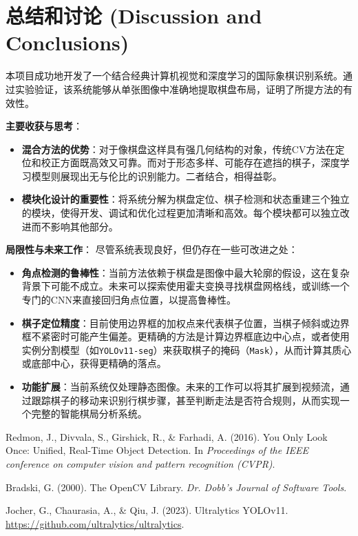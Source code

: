 \documentclass[12pt, a4paper]{article}
\begin{document}
\section{总结和讨论 (Discussion and Conclusions)}
本项目成功地开发了一个结合经典计算机视觉和深度学习的国际象棋识别系统。通过实验验证，该系统能够从单张图像中准确地提取棋盘布局，证明了所提方法的有效性。


\textbf{主要收获与思考}：
\begin{itemize}
    \item \textbf{混合方法的优势}：对于像棋盘这样具有强几何结构的对象，传统CV方法在定位和校正方面既高效又可靠。而对于形态多样、可能存在遮挡的棋子，深度学习模型则展现出无与伦比的识别能力。二者结合，相得益彰。
    \item \textbf{模块化设计的重要性}：将系统分解为棋盘定位、棋子检测和状态重建三个独立的模块，使得开发、调试和优化过程更加清晰和高效。每个模块都可以独立改进而不影响其他部分。
\end{itemize}

\textbf{局限性与未来工作}：
尽管系统表现良好，但仍存在一些可改进之处：
\begin{itemize}
    \item \textbf{角点检测的鲁棒性}：当前方法依赖于棋盘是图像中最大轮廓的假设，这在复杂背景下可能不成立。未来可以探索使用霍夫变换寻找棋盘网格线，或训练一个专门的CNN来直接回归角点位置，以提高鲁棒性。
    \item \textbf{棋子定位精度}：目前使用边界框的加权点来代表棋子位置，当棋子倾斜或边界框不紧密时可能产生偏差。更精确的方法是计算边界框底边中心点，或者使用实例分割模型（如\texttt{YOLOv11-seg}）来获取棋子的掩码（\texttt{Mask}），从而计算其质心或底部中心，获得更精确的落点。
    \item \textbf{功能扩展}：当前系统仅处理静态图像。未来的工作可以将其扩展到视频流，通过跟踪棋子的移动来识别行棋步骤，甚至判断走法是否符合规则，从而实现一个完整的智能棋局分析系统。
\end{itemize}

\begin{thebibliography}{9}
    Redmon, J., Divvala, S., Girshick, R., \& Farhadi, A. (2016). You Only Look Once: Unified, Real-Time Object Detection. In \textit{Proceedings of the IEEE conference on computer vision and pattern recognition (CVPR)}.
    
    Bradski, G. (2000). The OpenCV Library. \textit{Dr. Dobb's Journal of Software Tools}.
    
    Jocher, G., Chaurasia, A., \& Qiu, J. (2023). Ultralytics YOLOv11. \url{https://github.com/ultralytics/ultralytics}.
    
\end{thebibliography}
\end{document}

